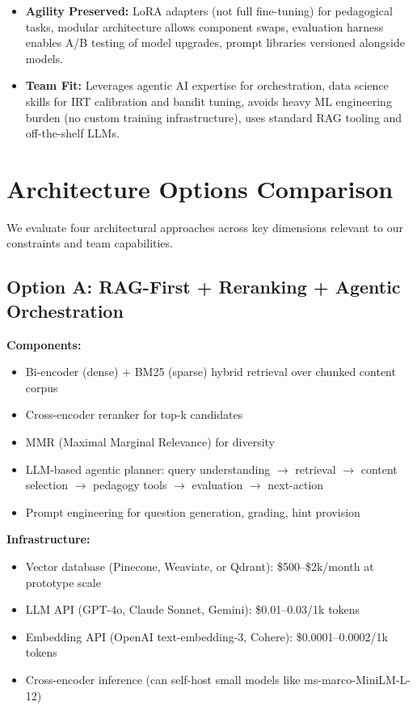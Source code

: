 \documentclass[11pt,letterpaper]{article}
\begin{document}
\begin{itemize}[leftmargin=*]
\item \textbf{Agility Preserved:} LoRA adapters (not full fine-tuning) for pedagogical tasks, modular architecture allows component swaps, evaluation harness enables A/B testing of model upgrades, prompt libraries versioned alongside models.

\item \textbf{Team Fit:} Leverages agentic AI expertise for orchestration, data science skills for IRT calibration and bandit tuning, avoids heavy ML engineering burden (no custom training infrastructure), uses standard RAG tooling and off-the-shelf LLMs.
\end{itemize}

\newpage

\section{Architecture Options Comparison}\label{sec:architecture-options}

We evaluate four architectural approaches across key dimensions relevant to our constraints and team capabilities.

\subsection{Option A: RAG-First + Reranking + Agentic Orchestration}\label{subsec:option-a}

\textbf{Components:}
\begin{itemize}
\item Bi-encoder (dense) + BM25 (sparse) hybrid retrieval over chunked content corpus
\item Cross-encoder reranker for top-k candidates
\item MMR (Maximal Marginal Relevance) for diversity
\item LLM-based agentic planner: query understanding $\rightarrow$ retrieval $\rightarrow$ content selection $\rightarrow$ pedagogy tools $\rightarrow$ evaluation $\rightarrow$ next-action
\item Prompt engineering for question generation, grading, hint provision
\end{itemize}

\textbf{Infrastructure:}
\begin{itemize}
\item Vector database (Pinecone, Weaviate, or Qdrant): \$500--\$2k/month at prototype scale
\item LLM API (GPT-4o, Claude Sonnet, Gemini): \$0.01--0.03/1k tokens
\item Embedding API (OpenAI text-embedding-3, Cohere): \$0.0001--0.0002/1k tokens
\item Cross-encoder inference (can self-host small models like ms-marco-MiniLM-L-12)
\end{itemize}
\end{document}
